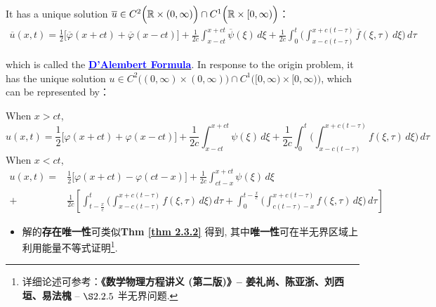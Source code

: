 \begin{thm}
		\vspace*{1em}
		
		\hspace*{-1.95em}It has a unique solution $\overline{u} \in C^2 \Big( \mathbb{R} \times (0 , \infty) \Big) \cap C^1 \Big( \mathbb{R} \times [0 , \infty) \Big)$：
		\begin{align}
			\overline{u}(x , t) = \frac{1}{2} \Big[ \overline{\varphi}(x + ct) + \overline{\varphi}(x - ct) \Big] + \frac{1}{2c} \int_{x - ct}^{x + ct} \overline{\psi}(\xi) \, d\xi + \frac{1}{2c} \int_{0}^t \Big( \int_{x - c(t - \tau)}^{x + c(t - \tau)} \overline{f}(\xi , \tau) \, d\xi \Big) \, d\tau \label{2.15}
		\end{align}
		
		\vspace*{1em}
		
		\hspace*{-1.95em}which is called the \underline{\textcolor{blue}{\textbf{D'Alembert Formula}}}. In response to the origin problem, it has the unique solution $u \in C^2 \Big( (0 , \infty) \times (0 , \infty) \Big) \cap C^1 \Big( [0 , \infty) \times [0 , \infty) \Big)$, which can be represented by：
		
		\vspace*{1em}
		
		\hspace*{-1.95em}When $x > ct$, 
		\[ u(x , t) = \frac{1}{2} \Big[ \varphi(x + ct) + \varphi(x - ct) \Big] + \frac{1}{2c} \int_{x - ct}^{x + ct} \psi(\xi) \, d\xi + \frac{1}{2c} \int_{0}^t \Big( \int_{x - c(t - \tau)}^{x + c(t - \tau)} f(\xi , \tau) \, d\xi \Big) \, d\tau \]
		When $x < ct$, 
		\begin{align*}
			u(x , t) 
			= &\frac{1}{2} \Big[ \varphi(x + ct) - \varphi(ct - x) \Big] 
			+ \frac{1}{2c} \int_{ct - x}^{x + ct} \psi(\xi) \, d\xi \\
			+ &\frac{1}{2c} \left[ \int_{t - \tfrac{x}{c}}^t \Big( \int_{x - c(t - \tau)}^{x + c(t - \tau)} f(\xi , \tau) \, d\xi \Big) \, d\tau + \int_{0}^{t - \tfrac{x}{c}} \Big( \int_{c(t - \tau) - x}^{x + c(t - \tau)} f(\xi , \tau) \, d\xi \Big) \, d\tau \right]
		\end{align*}
		
		\newpage
		
		\begin{rmk}
			\begin{itemize}
				\item 解的\textbf{存在唯一性}可类似\textbf{Thm \ref{thm 2.3.2}} 得到, 其中\textbf{唯一性}可在半无界区域上利用能量不等式证明\footnote{详细论述可参考：\textbf{《数学物理方程讲义 (第二版)》--  姜礼尚、陈亚浙、刘西垣、易法槐} -- $\S 2.2.5$ 半无界问题. }.
				

\end{itemize}
\end{rmk}
\end{thm}
